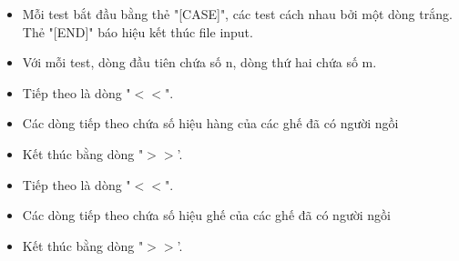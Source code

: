 \begin{itemize}
	\item     Mỗi test bắt đầu bằng thẻ "[CASE]", các test cách nhau bởi một dòng trắng. Thẻ "[END]" báo hiệu kết thúc file input.   
	\item     Với mỗi test, dòng đầu tiên chứa số n, dòng thứ hai chứa số m.   
	\item     Tiếp theo là dòng "$<$$<$".   
	\item     Các dòng tiếp theo chứa số hiệu hàng của các ghế đã có người ngồi   
	\item     Kết thúc bằng dòng "$>$$>$'.   
	\item     Tiếp theo là dòng "$<$$<$".   
	\item     Các dòng tiếp theo chứa số hiệu ghế của các ghế đã có người ngồi   
	\item     Kết thúc bằng dòng "$>$$>$'.   
\end{itemize}
